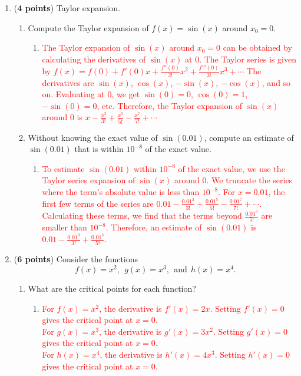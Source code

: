 \documentclass[11pt]{article}
\begin{document}
\begin{enumerate}
\begin{enumerate}
  \end{enumerate}
  
\item ({\bf 4 points}) Taylor expansion.
  \begin{enumerate}
  \item Compute the Taylor expansion of $f(x) = \sin(x)$ around $x_0 =
    0$.
    \begin{enumerate}
        \item[\textcolor{red}{}] \textcolor{red}{
            The Taylor expansion of $\sin(x)$ around $x_0 = 0$ can be obtained by calculating the derivatives of $\sin(x)$ at 0. The Taylor series is given by $f(x) = f(0) + f'(0)x + \frac{f''(0)}{2!}x^2 + \frac{f'''(0)}{3!}x^3 + \cdots$ The derivatives are $\sin(x)$, $\cos(x)$, $-\sin(x)$, $-\cos(x)$, and so on. Evaluating at 0, we get $\sin(0) = 0$, $\cos(0) = 1$, $-\sin(0) = 0$, etc. Therefore, the Taylor expansion of $\sin(x)$ around 0 is $x - \frac{x^3}{3!} + \frac{x^5}{5!} - \frac{x^7}{7!} + \cdots$
        }
    \end{enumerate}
    
  \item Without knowing the exact value of $\sin(0.01)$, compute an
    estimate of $\sin(0.01)$ that is within $10^{-8}$ of the exact
    value.
    \begin{enumerate}
        \item[\textcolor{red}{}] \textcolor{red}{
            To estimate $\sin(0.01)$ within $10^{-8}$ of the exact value, we use the Taylor series expansion of $\sin(x)$ around 0. We truncate the series where the term's absolute value is less than $10^{-8}$. For $x = 0.01$, the first few terms of the series are $0.01 - \frac{0.01^3}{3!} + \frac{0.01^5}{5!} - \frac{0.01^7}{7!} + \cdots$. Calculating these terms, we find that the terms beyond $\frac{0.01^5}{5!}$ are smaller than $10^{-8}$. Therefore, an estimate of $\sin(0.01)$ is $0.01 - \frac{0.01^3}{3!} + \frac{0.01^5}{5!}$.
        }
    \end{enumerate}
    
  \end{enumerate}
  
\item ({\bf 6 points}) Consider the functions 
  $$
  f(x) = x^2, \ \  g(x) = x^3, \ \ \text{and} \  \ h(x) = x^4.
  $$
  \begin{enumerate}
  \item What are the critical points for each function?

    \begin{enumerate}
        \item[\textcolor{red}{}] \textcolor{red}{
            For $f(x) = x^2$, the derivative is $f'(x) = 2x$. Setting $f'(x) = 0$ gives the critical point at $x = 0$. \\
            For $g(x) = x^3$, the derivative is $g'(x) = 3x^2$. Setting $g'(x) = 0$ gives the critical point at $x = 0$. \\
            For $h(x) = x^4$, the derivative is $h'(x) = 4x^3$. Setting $h'(x) = 0$ gives the critical point at $x = 0$.
        }
    \end{enumerate}


\end{enumerate}
\end{enumerate}
\end{document}
